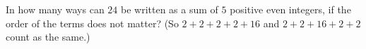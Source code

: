 In how many ways can $24$ be written as a sum of $5$ positive even integers, if the order of the terms does not matter? (So $2+2+2+2+16$ and $2+2+16+2+2$ count as the same.)
